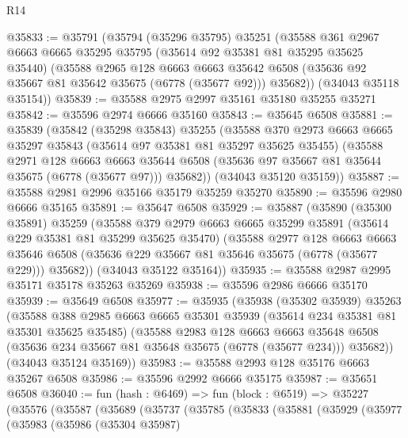 \begin{lexlean}{R14}
\begin{coremodule}
@35833 := @35791
    (@35794
      (@35296 @35795)
      @35251
      (@35588
        @361
        @2967
        @6663
        @6665
        @35295
        @35795
        (@35614 @92 @35381 @81 @35295 @35625 @35440)
        (@35588
          @2965
          @128
          @6663
          @6663
          @35642
          @6508
          (@35636 @92 @35667 @81 @35642 @35675 (@6778 (@35677 @92)))
          @35682))
      (@34043 @35118 @35154))
@35839 := @35588 @2975 @2997 @35161 @35180 @35255 @35271
@35842 := @35596 @2974 @6666 @35160
@35843 := @35645 @6508
@35881 := @35839
    (@35842
      (@35298 @35843)
      @35255
      (@35588
        @370
        @2973
        @6663
        @6665
        @35297
        @35843
        (@35614 @97 @35381 @81 @35297 @35625 @35455)
        (@35588
          @2971
          @128
          @6663
          @6663
          @35644
          @6508
          (@35636 @97 @35667 @81 @35644 @35675 (@6778 (@35677 @97)))
          @35682))
      (@34043 @35120 @35159))
@35887 := @35588 @2981 @2996 @35166 @35179 @35259 @35270
@35890 := @35596 @2980 @6666 @35165
@35891 := @35647 @6508
@35929 := @35887
    (@35890
      (@35300 @35891)
      @35259
      (@35588
        @379
        @2979
        @6663
        @6665
        @35299
        @35891
        (@35614 @229 @35381 @81 @35299 @35625 @35470)
        (@35588
          @2977
          @128
          @6663
          @6663
          @35646
          @6508
          (@35636 @229 @35667 @81 @35646 @35675 (@6778 (@35677 @229)))
          @35682))
      (@34043 @35122 @35164))
@35935 := @35588 @2987 @2995 @35171 @35178 @35263 @35269
@35938 := @35596 @2986 @6666 @35170
@35939 := @35649 @6508
@35977 := @35935
    (@35938
      (@35302 @35939)
      @35263
      (@35588
        @388
        @2985
        @6663
        @6665
        @35301
        @35939
        (@35614 @234 @35381 @81 @35301 @35625 @35485)
        (@35588
          @2983
          @128
          @6663
          @6663
          @35648
          @6508
          (@35636 @234 @35667 @81 @35648 @35675 (@6778 (@35677 @234)))
          @35682))
      (@34043 @35124 @35169))
@35983 := @35588 @2993 @128 @35176 @6663 @35267 @6508
@35986 := @35596 @2992 @6666 @35175
@35987 := @35651 @6508
@36040 := fun (hash : @6469) =>
  fun (block : @6519) =>
  @35227
    (@35576
      (@35587
        (@35689
          (@35737
            (@35785
              (@35833
                (@35881
                  (@35929
                    (@35977
                      (@35983
                        (@35986
                          (@35304 @35987)

\end{coremodule}
\end{lexlean}
